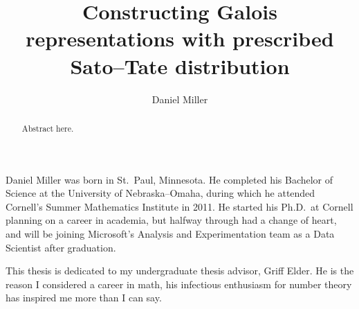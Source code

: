 \documentclass[phd,cornellheadings]{cornell}
\title{Constructing Galois representations with prescribed Sato--Tate 
distribution}
\author{Daniel Miller}
\begin{document}
\maketitle
\makecopyright

\begin{abstract}
Abstract here. 
\end{abstract}

\begin{biosketch}
Daniel Miller was born in St.~Paul, Minnesota. He completed his Bachelor of 
Science at the University of Nebraska--Omaha, during which he attended 
Cornell's Summer Mathematics Institute in 2011. He started his Ph.D.~at 
Cornell planning on a career in academia, but halfway through had a change of 
heart, and will be joining Microsoft's Analysis and Experimentation team as a 
Data Scientist after graduation. 
\end{biosketch}

\begin{dedication}
This thesis is dedicated to my undergraduate thesis advisor, Griff Elder. 
He is the reason I considered a career in math, his infectious enthusiasm for 
number theory has inspired me more than I can say. 
\end{dedication}
\end{document}
